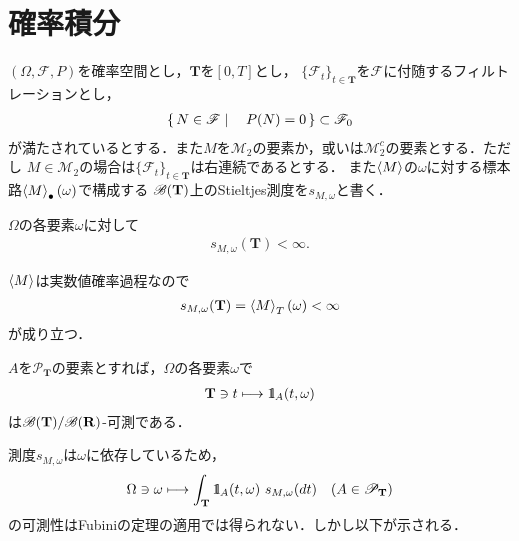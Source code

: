 \section{確率積分}
	$(\Omega,\mathscr{F},P)$を確率空間とし，$\mathbf{T}$を$[0,T]$とし，
	$\{\mathscr{F}_t\}_{t \in \mathbf{T}}$を$\mathscr{F}$に付随するフィルトレーションとし，
	\begin{align}
		\left\{\, N \in \mathscr{F} \mid \quad P(N) = 0\, \right\} \subset \mathscr{F}_0
	\end{align}
	が満たされているとする．また$M$を$\mathscr{M}_2$の要素か，或いは$\mathscr{M}_2^c$の要素とする．ただし
	$M \in \mathscr{M}_2$の場合は$\{\mathscr{F}_t\}_{t \in \mathbf{T}}$は右連続であるとする．
	また$\inprod<M>$の$\omega$に対する標本路$\inprod<M>_\bullet(\omega)$で構成する
	$\mathscr{B}(\mathbf{T})$上のStieltjes測度を$s_{M,\omega}$と書く．
	
	\begin{screen}
		\begin{thm}
			$\Omega$の各要素$\omega$に対して
			\begin{align}
				s_{M,\omega}(\mathbf{T}) < \infty.
			\end{align}
		\end{thm}
	\end{screen}
	
	\begin{prf}
		$\inprod<M>$は実数値確率過程なので
		\begin{align}
			s_{M,\omega}(\mathbf{T}) = \inprod<M>_T(\omega) < \infty
		\end{align}
		が成り立つ．
		\QED
	\end{prf}
	
	\begin{screen}
		\begin{thm}
			$A$を$\mathscr{P}_{\mathbf{T}}$の要素とすれば，$\Omega$の各要素$\omega$で
			\begin{align}
				\mathbf{T} \ni t \longmapsto \mbox{1}\hspace{-0.25em}\mbox{l}_A(t,\omega)
			\end{align}
			は$\mathscr{B}(\mathbf{T})/\mathscr{B}(\mathbf{R})$-可測である．
		\end{thm}
	\end{screen}
	
	測度$s_{M,\omega}$は$\omega$に依存しているため，
	\begin{align}
		\Omega \ni \omega \longmapsto \int_{\mathbf{T}} \mbox{1}\hspace{-0.25em}\mbox{l}_A(t,\omega)\ s_{M,\omega}(dt)
		\quad (A \in \mathscr{P}_{\mathbf{T}})
	\end{align}
	の可測性はFubiniの定理の適用では得られない．しかし以下が示される．
	
